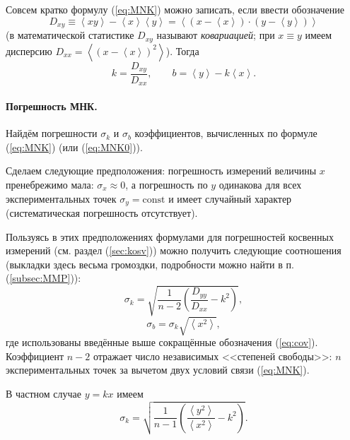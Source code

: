 {\footnotesize{}Совсем кратко формулу (\ref{eq:MNK}) можно записать,
если ввести обозначение
\begin{equation}
D_{xy}\equiv\left\langle xy\right\rangle -\left\langle x\right\rangle \left\langle y\right\rangle =\left\langle \left(x-\left\langle x\right\rangle \right)\cdot\left(y-\left\langle y\right\rangle \right)\right\rangle \label{eq:cov}
\end{equation}
(в математической статистике $D_{xy}$ называют }\emph{\footnotesize{}ковариацией}{\footnotesize{};
при $x\equiv y$ имеем дисперсию $D_{xx}=\left\langle \left(x-\left\langle x\right\rangle \right)^{2}\right\rangle $).
Тогда
\begin{equation}
k=\frac{D_{xy}}{D_{xx}},\qquad b=\left\langle y\right\rangle -k\left\langle x\right\rangle .\label{eq:MNK_short}
\end{equation}
}{\footnotesize\par}

\paragraph{Погрешность МНК.}

Найдём погрешности $\sigma_{k}$ и $\sigma_{b}$ коэффициентов, вычисленных
по формуле (\ref{eq:MNK}) (или (\ref{eq:MNK0})).

Сделаем следующие предположения: погрешность измерений величины $x$
пренебрежимо мала: $\sigma_{x}\approx0$, а погрешность по $y$ одинакова
для всех экспериментальных точек $\sigma_{y}=\mathrm{const}$ и имеет
случайный характер (систематическая погрешность отсутствует).

Пользуясь в этих предположениях формулами для погрешностей косвенных
измерений (см. раздел (\ref{sec:kosv})) можно получить следующие
соотношения (выкладки здесь весьма громоздки, подробности можно найти
в п. (\ref{subsec:MMP})):
\begin{equation}
\sigma_{k}=\sqrt{\frac{1}{n-2}\left(\frac{D_{yy}}{D_{xx}}-k^{2}\right)},\label{eq:MNK_sigma}
\end{equation}
\begin{equation}
\sigma_{b}=\sigma_{k}\sqrt{\left\langle x^{2}\right\rangle },\label{eq:MNK_sigma_b}
\end{equation}
где использованы введённые выше сокращённые обозначения (\ref{eq:cov}).
Коэффициент $n-2$ отражает число независимых <<степеней
свободы>>: $n$ экспериментальных точек за вычетом двух
условий связи (\ref{eq:MNK}).

В частном случае $y=kx$ имеем
\begin{equation}
\sigma_{k}=\sqrt{\frac{1}{n-1}\left(\frac{\left\langle y^{2}\right\rangle }{\left\langle x^{2}\right\rangle }-k^{2}\right)}.\label{eq:MNK_sigma0}
\end{equation}


